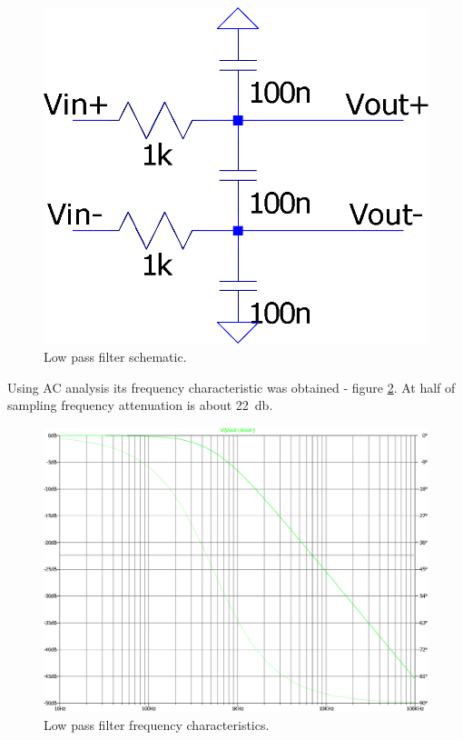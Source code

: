         \begin{figure}[H]
            \centering
            \includegraphics[width=0.3\paperwidth]{img/06/low_pass_filter.eps}
            \caption{Low pass filter schematic.}
            \label{low_pass_filter}
        \end{figure}

        Using AC analysis its frequency characteristic was obtained - figure \ref{low_pass_filter_output}. At half of sampling frequency attenuation is about \SI{22}{\decibel}.

        \begin{figure}[H]
            \centering
            \includegraphics[width=0.6\paperwidth]{img/06/low_pass_filter_output.eps}
            \caption{Low pass filter frequency characteristics.}
            \label{low_pass_filter_output}
        \end{figure}

